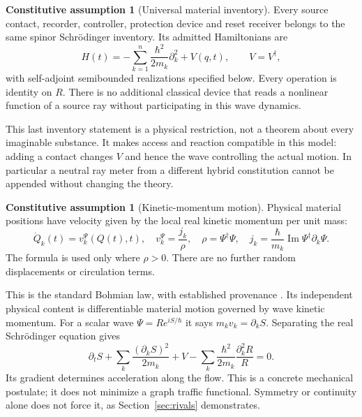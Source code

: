 \documentclass[11pt]{article}
\theoremstyle{definition}\newtheorem{assumption}[theorem]{Constitutive assumption}
\theoremstyle{remark}\newtheorem{remark}[theorem]{Remark}
\begin{document}
\begin{assumption}[Universal material inventory]\label{ax:material}
Every source contact, recorder, controller, protection device and reset receiver belongs to the same spinor Schr\"odinger inventory. Its admitted Hamiltonians are
\begin{equation}\label{eq:H}
 H(t)=-\sum_{k=1}^n\frac{\hbar^2}{2m_k}\partial_k^2+V(q,t),
 \qquad V=V^\dagger,
\end{equation}
with self-adjoint semibounded realizations specified below. Every operation is identity on $R$. There is no additional classical device that reads a nonlinear function of a source ray without participating in this wave dynamics.
\end{assumption}
This last inventory statement is a physical restriction, not a theorem about every imaginable substance. It makes access and reaction compatible in this model: adding a contact changes $V$ and hence the wave controlling the actual motion. In particular a neutral ray meter from a different hybrid constitution cannot be appended without changing the theory.

\begin{assumption}[Kinetic-momentum motion]\label{ax:motion}
Physical material positions have velocity given by the local real kinetic momentum per unit mass:
\begin{equation}\label{eq:guidance}
 \dot Q_k(t)=v_k^\Psi(Q(t),t),\quad
 v_k^\Psi=\frac{j_k}{\rho},\quad
 \rho=\Psi^\dagger\Psi,\quad
 j_k=\frac{\hbar}{m_k}\operatorname{Im}\Psi^\dagger\partial_k\Psi.
\end{equation}
The formula is used only where $\rho>0$. There are no further random displacements or circulation terms.
\end{assumption}
This is the standard Bohmian law, with established provenance \cite{BohmI,BohmII,DGZoperators}. Its independent physical content is differentiable material motion governed by wave kinetic momentum. For a scalar wave $\Psi=Re^{iS/\hbar}$ it says $m_kv_k=\partial_kS$. Separating the real Schr\"odinger equation gives
\[
 \partial_tS+\sum_k\frac{(\partial_kS)^2}{2m_k}+V
 -\sum_k\frac{\hbar^2}{2m_k}\frac{\partial_k^2R}{R}=0.
\]
Its gradient determines acceleration along the flow. This is a concrete mechanical postulate; it does not minimize a graph traffic functional. Symmetry or continuity alone does not force it, as Section~\ref{sec:rivals} demonstrates.
\end{document}
